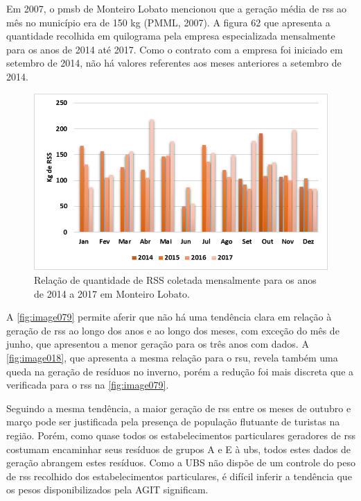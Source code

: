 	
	Em 2007, o \gls{pmsb} de Monteiro Lobato mencionou que a geração média de \gls{rss} ao mês no município era de 150 kg (PMML, 2007). A figura 62 que apresenta a quantidade recolhida em quilograma pela empresa especializada mensalmente para os anos de 2014 até 2017. Como o contrato com a empresa foi iniciado em setembro de 2014, não há valores referentes aos meses anteriores a setembro de 2014.
	
	
	\begin{figure}
		\centering
		\includegraphics[width=0.75\linewidth]{produtos/prodtres/image079}
		\caption{Relação de quantidade de RSS coletada mensalmente para os anos de 2014 a 2017 em Monteiro Lobato.}
		\label{fig:image079}
	\end{figure}
	
	
	A \autoref{fig:image079} permite aferir que não há uma tendência clara em relação à geração de \gls{rss} ao longo dos anos e ao longo dos meses, com exceção do mês de junho, que apresentou a menor geração para os três anos com dados. A \autoref{fig:image018}, que apresenta a mesma relação para o \gls{rsu}, revela também uma queda na geração de resíduos no inverno, porém a redução foi mais discreta que a verificada para o \gls{rss} na \autoref{fig:image079}.

	Seguindo a mesma tendência, a maior geração de \gls{rss} entre os meses de outubro e março pode ser justificada pela presença de população flutuante de turistas na região. Porém, como quase todos os estabelecimentos particulares geradores de \gls{rss} costumam encaminhar seus resíduos de grupos A e E à \gls{ubs}, todos estes dados de geração abrangem estes resíduos. Como a UBS não dispõe de um controle do peso de \gls{rss} recolhido dos estabelecimentos particulares, é difícil inferir a tendência que os pesos disponibilizados pela AGIT significam.

